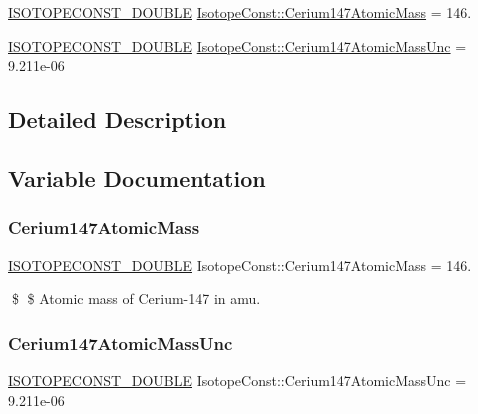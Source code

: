\begin{DoxyCompactItemize}
\item 
\mbox{\hyperlink{group___isotope_const-_macros_ga8f45a7272ce02c0b4c65c44636ed719a}{I\+S\+O\+T\+O\+P\+E\+C\+O\+N\+S\+T\+\_\+\+D\+O\+U\+B\+LE}} \mbox{\hyperlink{group___isotope_const-_cerium-_ce147_ga0a2b3f77a3275452d718e8b31d09625e}{Isotope\+Const\+::\+Cerium147\+Atomic\+Mass}} = 146.
\item 
\mbox{\hyperlink{group___isotope_const-_macros_ga8f45a7272ce02c0b4c65c44636ed719a}{I\+S\+O\+T\+O\+P\+E\+C\+O\+N\+S\+T\+\_\+\+D\+O\+U\+B\+LE}} \mbox{\hyperlink{group___isotope_const-_cerium-_ce147_ga0af10882378465a91c1a2c932385aad3}{Isotope\+Const\+::\+Cerium147\+Atomic\+Mass\+Unc}} = 9.\+211e-\/06
\end{DoxyCompactItemize}


\subsection{Detailed Description}


\subsection{Variable Documentation}
\mbox{\label{group___isotope_const-_cerium-_ce147_ga0a2b3f77a3275452d718e8b31d09625e}} 
\subsubsection{\texorpdfstring{Cerium147\+Atomic\+Mass}{Cerium147AtomicMass}}
{\footnotesize\ttfamily \mbox{\hyperlink{group___isotope_const-_macros_ga8f45a7272ce02c0b4c65c44636ed719a}{I\+S\+O\+T\+O\+P\+E\+C\+O\+N\+S\+T\+\_\+\+D\+O\+U\+B\+LE}} Isotope\+Const\+::\+Cerium147\+Atomic\+Mass = 146.}

\$ \$ Atomic mass of Cerium-\/147 in amu. \mbox{\label{group___isotope_const-_cerium-_ce147_ga0af10882378465a91c1a2c932385aad3}} 
\subsubsection{\texorpdfstring{Cerium147\+Atomic\+Mass\+Unc}{Cerium147AtomicMassUnc}}
{\footnotesize\ttfamily \mbox{\hyperlink{group___isotope_const-_macros_ga8f45a7272ce02c0b4c65c44636ed719a}{I\+S\+O\+T\+O\+P\+E\+C\+O\+N\+S\+T\+\_\+\+D\+O\+U\+B\+LE}} Isotope\+Const\+::\+Cerium147\+Atomic\+Mass\+Unc = 9.\+211e-\/06}

